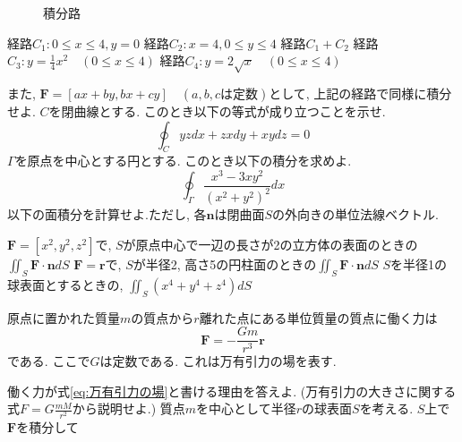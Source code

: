 \documentclass[a4j,dvipdfmx]{jsarticle}
\begin{document}
\begin{qparts}
\begin{figure}[h]
                \caption{積分路}\label{積分路}
            \end{figure}
            \begin{qlist}
                \qitem 経路$C_1:0\leq x\leq 4,y=0$
                \qitem 経路$C_2:x=4,0\leq y\leq 4$
                \qitem 経路$C_1+C_2$
                \qitem 経路$C_3:\displaystyle y=\frac{1}{4}x^2\quad (0\leq x\leq 4)$
                \qitem 経路$C_4:\displaystyle y=2\sqrt{x} \quad (0\leq x\leq 4)$
            \end{qlist}
            また, $\bm{F}=[ax+by,bx+cy]\quad(a,b,c\text{は定数})$として, 上記の経路で同様に積分せよ.
        \qpart $C$を閉曲線とする. このとき以下の等式が成り立つことを示せ.
            \begin{equation*}
                \oint_C yzdx+zxdy+xydz = 0
            \end{equation*}
        \qpart $\Gamma$を原点を中心とする円とする. このとき以下の積分を求めよ.
            \begin{equation*}
                \oint_\Gamma \frac{x^3-3xy^2}{(x^2+y^2)^2}dx
            \end{equation*}
        \qpart 以下の面積分を計算せよ.ただし, 各$\bm{n}$は閉曲面$S$の外向きの単位法線ベクトル.
            \begin{qlist}
                \qitem $\bm{F}=[x^2,y^2,z^2]$で, $S$が原点中心で一辺の長さが2の立方体の表面のときの$\displaystyle \iint_S \bm{F}\cdot\bm{n}dS$
                \qitem $\bm{F}=\bm{r}$で, $S$が半径2, 高さ5の円柱面のときの$\displaystyle \iint_S\bm{F}\cdot\bm{n}dS$
                \qitem $S$を半径1の球表面とするときの, $\displaystyle\iint_S (x^4+y^4+z^4)dS$
            \end{qlist}
        \qpart 原点に置かれた質量$m$の質点から$r$離れた点にある単位質量の質点に働く力は
            \begin{equation}
                \bm{F}=-\frac{Gm}{r^3}\bm{r} \label{eq:万有引力の場}        
            \end{equation}
            である. ここで$G$は定数である. これは万有引力の場を表す.
            \begin{qlist}
                \qitem 働く力が式\eqref{eq:万有引力の場}と書ける理由を答えよ. (万有引力の大きさに関する式$F=G\frac{mM}{r^2}$から説明せよ.)
                \qitem 質点$m$を中心として半径$r$の球表面$S$を考える. $S$上で$\bm{F}$を積分して

\end{qlist}
\end{qparts}
\end{document}

